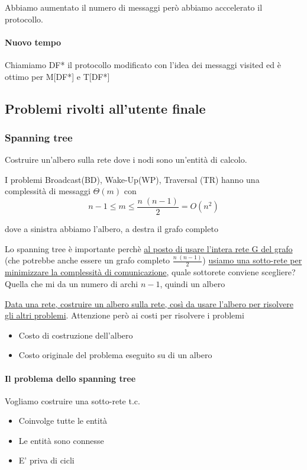 Abbiamo aumentato il numero di messaggi però abbiamo acccelerato il protocollo.

\paragraph{Nuovo tempo}

Chiamiamo DF* il protocollo modificato con l'idea dei messaggi visited ed è ottimo per M[DF*] e T[DF*]

\subsection{Problemi rivolti all'utente finale}
\subsubsection{Spanning tree}
Costruire un'albero sulla rete dove i nodi sono un'entità di calcolo.

\begin{osservazione}
    I problemi Broadcast(BD), Wake-Up(WP), Traversal (TR) hanno una complessità di messaggi $\Theta(m)$ con 
    $$n - 1 \leq m \leq \frac{n\;(n-1)}{2} = O(n^2)$$
\end{osservazione}
dove a sinistra abbiamo l'albero, a destra il grafo completo

Lo spanning tree è importante perchè \uline{al posto di usare l'intera rete G  del grafo} (che potrebbe anche essere un grafo completo $\frac{n\;(n-1)}{2}$) \uline{usiamo una sotto-rete per minimizzare la complessità di comunicazione}, quale sottorete conviene scegliere? Quella che mi da un numero di archi $n-1$, quindi un albero

 \uline{Data una rete, costruire un albero sulla rete, così da usare l'albero per risolvere gli altri problemi}. Attenzione però ai costi per risolvere i problemi
 \begin{itemize}
     \item Costo di costruzione dell'albero
     \item Costo originale del problema eseguito su di un albero
 \end{itemize}

\paragraph{Il problema dello spanning tree}
Vogliamo costruire una sotto-rete t.c.
\begin{itemize}
    \item Coinvolge tutte le entità
    \item Le entità sono connesse
    \item E' priva di cicli
\end{itemize}

